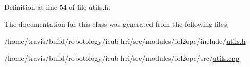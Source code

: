 Definition at line 54 of file utils.\+h.



The documentation for this class was generated from the following files\+:\begin{DoxyCompactItemize}
\item 
/home/travis/build/robotology/icub-\/hri/src/modules/iol2opc/include/\hyperlink{utils_8h}{utils.\+h}\item 
/home/travis/build/robotology/icub-\/hri/src/modules/iol2opc/src/\hyperlink{utils_8cpp}{utils.\+cpp}\end{DoxyCompactItemize}
